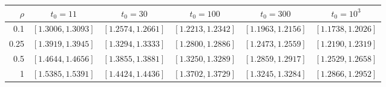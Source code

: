 \begin{tabular}{rccccc}
\toprule
$\rho$ & $t_0=11$ & $t_0=30$ & $t_0=100$ & $t_0=300$ & $t_0=10^{3}$\\
\midrule
0.1 & $[1.3006,1.3093]$ & $[1.2574,1.2661]$ & $[1.2213,1.2342]$ & $[1.1963,1.2156]$ & $[1.1738,1.2026]$\\
0.25 & $[1.3919,1.3945]$ & $[1.3294,1.3333]$ & $[1.2800,1.2886]$ & $[1.2473,1.2559]$ & $[1.2190,1.2319]$\\
0.5 & $[1.4644,1.4656]$ & $[1.3855,1.3881]$ & $[1.3250,1.3289]$ & $[1.2859,1.2917]$ & $[1.2529,1.2658]$\\
1 & $[1.5385,1.5391]$ & $[1.4424,1.4436]$ & $[1.3702,1.3729]$ & $[1.3245,1.3284]$ & $[1.2866,1.2952]$\\
\bottomrule
\end{tabular}
